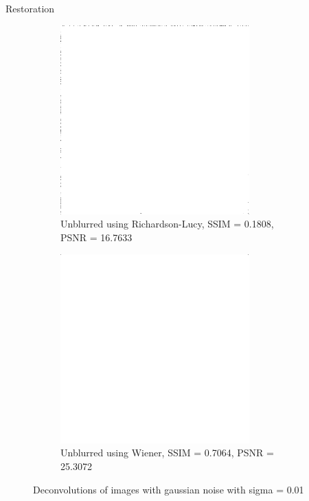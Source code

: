 \documentclass[aspectratio=1610]{beamer}
\begin{document}
\begin{frame}{Restoration}
  \begin{figure}
    \centering
    \begin{subfigure}[t]{0.4\textwidth}
        \includegraphics[width=0.8\textwidth]{images/unblurred_rl_low_noise.png}
        \caption{Unblurred using Richardson-Lucy, \break SSIM = 0.1808, PSNR = 16.7633}
        \label{fig:restored1}
    \end{subfigure}
    \begin{subfigure}[t]{0.4\textwidth}
        \includegraphics[width=0.8\textwidth]{images/unblurred_w_low_noise.png}
        \caption{Unblurred using Wiener, \break SSIM = 0.7064, PSNR = 25.3072}
        \label{fig:restored2}
    \end{subfigure}
    \caption{Deconvolutions of images with gaussian noise with sigma = 0.01}
  \end{figure}
\end{frame}
\end{document}
